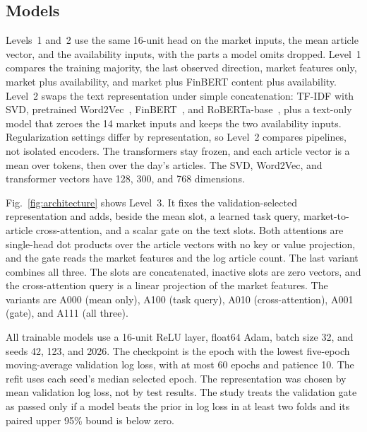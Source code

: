 \subsection{Models}
Levels~1 and~2 use the same 16-unit head on the market inputs, the mean article vector, and the availability inputs, with the parts a model omits dropped. Level~1 compares the training majority, the last observed direction, market features only, market plus availability, and market plus FinBERT content plus availability. Level~2 swaps the text representation under simple concatenation: TF-IDF with SVD, pretrained Word2Vec~\cite{mikolov2013}, FinBERT~\cite{araci2019}, and RoBERTa-base~\cite{liu2019}, plus a text-only model that zeroes the 14 market inputs and keeps the two availability inputs. Regularization settings differ by representation, so Level~2 compares pipelines, not isolated encoders. The transformers stay frozen, and each article vector is a mean over tokens, then over the day's articles. The SVD, Word2Vec, and transformer vectors have 128, 300, and 768 dimensions.

Fig.~\ref{fig:architecture} shows Level~3. It fixes the validation-selected representation and adds, beside the mean slot, a learned task query, market-to-article cross-attention, and a scalar gate on the text slots. Both attentions are single-head dot products over the article vectors with no key or value projection, and the gate reads the market features and the log article count. The last variant combines all three. The slots are concatenated, inactive slots are zero vectors, and the cross-attention query is a linear projection of the market features. The variants are A000 (mean only), A100 (task query), A010 (cross-attention), A001 (gate), and A111 (all three).

All trainable models use a 16-unit ReLU layer, float64 Adam, batch size 32, and seeds 42, 123, and 2026. The checkpoint is the epoch with the lowest five-epoch moving-average validation log loss, with at most 60 epochs and patience 10. The refit uses each seed's median selected epoch. The representation was chosen by mean validation log loss, not by test results. The study treats the validation gate as passed only if a model beats the prior in log loss in at least two folds and its paired upper 95\% bound is below zero.

